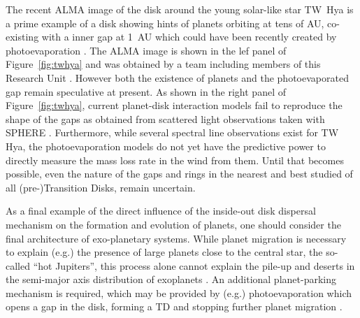 \documentclass[10pt,fleqn,twoside]{article}
\begin{document}
The recent ALMA image of the disk around the young solar-like star TW~Hya is a prime example of a disk showing hints of
planets orbiting at tens of AU,  co-existing with a inner gap at 1~AU
which could have been 
recently created by photoevaporation \citep{2017MNRAS.464L..95E}. The ALMA image
is shown in the lef panel of Figure~\ref{fig:twhya} and was obtained by
a team including members of this Research Unit \citep{2016ApJ...820L..40A}. 
However both the existence of planets and the
photoevaporated gap remain speculative at present. As shown in the
right panel of Figure~\ref{fig:twhya}, current planet-disk interaction
models fail to reproduce the shape of the gaps as obtained from
scattered light observations taken with SPHERE \citep{2016arXiv161008939V}. 
Furthermore, while several spectral line observations exist
for TW Hya, the photoevaporation models do not yet have the predictive
power to directly measure the mass loss rate in the wind from
them. Until that becomes possible, even the nature of the gaps and
rings in 
the nearest and best studied of all (pre-)Transition Disks, remain
uncertain. 

As a final example of the direct influence of the inside-out disk dispersal
mechanism on the formation and evolution of planets, one should
consider 
the final architecture of
exo-planetary systems. While planet migration is necessary to explain
(e.g.) the presence of large planets close to the central star, the
so-called ``hot Jupiters'', this process alone cannot explain the pile-up and
deserts in the semi-major axis distribution of exoplanets 
\citep[see also][]{2014ApJ...780...53C, 2015ApJ...798L..32C}. An
additional planet-parking mechanism is required, which may be provided by (e.g.)
photoevaporation which opens a gap in the disk, forming a TD and
stopping further planet migration \citep[e.g.,][]{2012MNRAS.422L..82A, 
2015MNRAS.450.3008E}.

\end{document}
